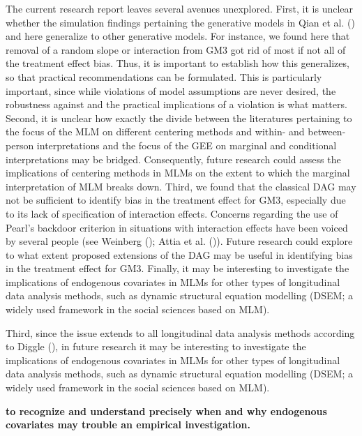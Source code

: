 \documentclass[
  11pt,
  a4paper,
]{article}
\begin{document}
The current research report leaves several avenues unexplored. First, it
is unclear whether the simulation findings pertaining the generative
models in Qian et al. () and here
generalize to other generative models. For instance, we found here that
removal of a random slope or interaction from GM3 got rid of most if not
all of the treatment effect bias. Thus, it is important to establish how
this generalizes, so that practical recommendations can be formulated.
This is particularly important, since while violations of model
assumptions are never desired, the robustness against and the practical
implications of a violation is what matters. Second, it is unclear how
exactly the divide between the literatures pertaining to the focus of
the MLM on different centering methods and within- and between-person
interpretations and the focus of the GEE on marginal and conditional
interpretations may be bridged. Consequently, future research could
assess the implications of centering methods in MLMs on the extent to
which the marginal interpretation of MLM breaks down. Third, we found
that the classical DAG may not be sufficient to identify bias in the
treatment effect for GM3, especially due to its lack of specification of
interaction effects. Concerns regarding the use of Pearl's backdoor
criterion in situations with interaction effects have been voiced by
several people (see Weinberg (); Attia
et al. ()). Future research could explore
to what extent proposed extensions of the DAG may be useful in
identifying bias in the treatment effect for GM3. Finally, it may be
interesting to investigate the implications of endogenous covariates in
MLMs for other types of longitudinal data analysis methods, such as
dynamic structural equation modelling (DSEM; a widely used framework in
the social sciences based on MLM).

Third, since the issue extends to all longitudinal data analysis methods
according to Diggle (), in future
research it may be interesting to investigate the implications of
endogenous covariates in MLMs for other types of longitudinal data
analysis methods, such as dynamic structural equation modelling (DSEM; a
widely used framework in the social sciences based on MLM).

\textbf{to recognize and understand precisely when and why endogenous
covariates may trouble an empirical investigation.}

\newpage
\end{document}
